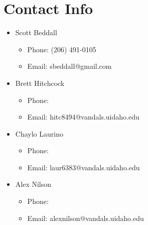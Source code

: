 \documentclass{article}
\begin{document}
\section{Contact Info}
\begin{itemize}
\item Scott Beddall 
  \begin{itemize}
    \item Phone: (206) 491-0105
    \item Email: sbeddall@gmail.com
  \end{itemize}
\item Brett Hitchcock
  \begin{itemize}
    \item Phone: 
    \item Email: hitc8494@vandals.uidaho.edu
  \end{itemize}
\item Chaylo Laurino
  \begin{itemize}
    \item Phone: 
    \item Email: laur6383@vandals.uidaho.edu
  \end{itemize}
\item Alex Nilson
  \begin{itemize}
    \item Phone: 
    \item Email: alexnilson@vandals.uidaho.edu
  \end{itemize}
\end{itemize}
\end{document}
